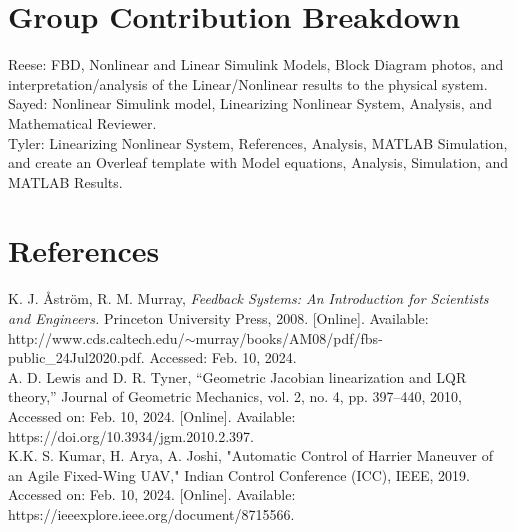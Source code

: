 \documentclass[conference]{IEEEtran}
\begin{document}
\newpage
\section{Group Contribution Breakdown}
Reese: FBD, Nonlinear and Linear Simulink Models, Block Diagram photos, and interpretation/analysis of the Linear/Nonlinear results to the physical system.\\

Sayed: Nonlinear Simulink model, Linearizing Nonlinear System, Analysis, and Mathematical Reviewer.  \\

Tyler: Linearizing Nonlinear System, References, Analysis, MATLAB Simulation, and create an Overleaf template with Model equations, Analysis, Simulation, and MATLAB Results. \\

\section{References}
\noindent [1] K. J. Åström, R. M. Murray, \textit{Feedback Systems: An Introduction for Scientists and Engineers.} Princeton University Press, 2008. [Online]. Available: http://www.cds.caltech.edu/$\sim$murray/books/AM08/pdf/fbs-public\_24Jul2020.pdf. 
Accessed: Feb. 10, 2024. \\

\noindent [2] A. D. Lewis and D. R. Tyner, “Geometric Jacobian linearization and LQR theory,” Journal of Geometric Mechanics, vol. 2, no. 4, pp. 397–440, 2010, Accessed on: Feb. 10, 2024. [Online]. Available: https://doi.org/10.3934/jgm.2010.2.397. \\

\noindent [3] K.K. S. Kumar, H. Arya, A. Joshi, "Automatic Control of Harrier Maneuver of an Agile Fixed-Wing UAV," Indian Control Conference (ICC), IEEE, 2019. Accessed on: Feb. 10, 2024. [Online]. Available: https://ieeexplore.ieee.org/document/8715566. \\
\end{document}
